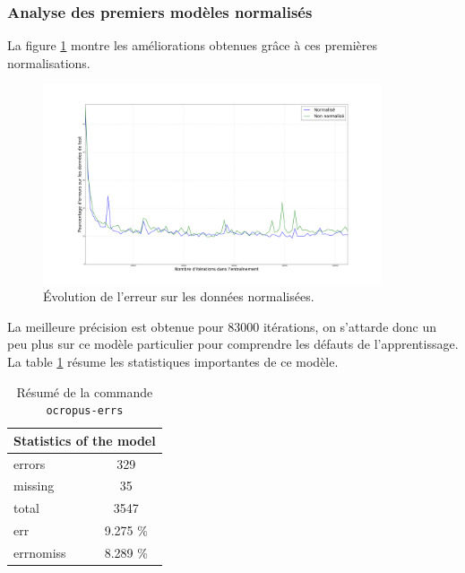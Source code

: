 \documentclass{article}
\begin{document}
\subsubsection{Analyse des premiers modèles normalisés}

La figure \ref{err_norm} montre les améliorations obtenues grâce à ces premières normalisations.

\begin{figure}[!h] 
    \center
    \includegraphics[width=10cm]{error_plot_norm.png}
    \caption{Évolution de l'erreur sur les données normalisées.}
    \label{err_norm}
\end{figure}

La meilleure précision est obtenue pour 83000 itérations, on s'attarde donc un peu plus sur ce modèle particulier pour comprendre les défauts de l'apprentissage. La table \ref{t2} résume les statistiques importantes de ce modèle. \\

\begin{table}[!h]
    \centering
    \begin{tabular}{|l|l|lc|l|l|}
        \hline
        \multicolumn{6}{|c|}{\cellcolor[gray]{0.8}Statistics of the model}                   \\ \hline
        \multicolumn{3}{|l|}{errors}    & \multicolumn{3}{c|}{329}      \\ \hline
        \multicolumn{3}{|l|}{missing}   & \multicolumn{3}{c|}{35}       \\ \hline
        \multicolumn{3}{|l|}{total}     & \multicolumn{3}{c|}{3547}     \\ \hline
        \multicolumn{3}{|l|}{err}       & \multicolumn{3}{c|}{9.275 \%} \\ \hline
        \multicolumn{3}{|l|}{errnomiss} & \multicolumn{3}{c|}{8.289 \%} \\ \hline
    \end{tabular}
    \caption{Résumé de la commande \texttt{ocropus-errs}}
    \label{t2}
\end{table}
\end{document}
